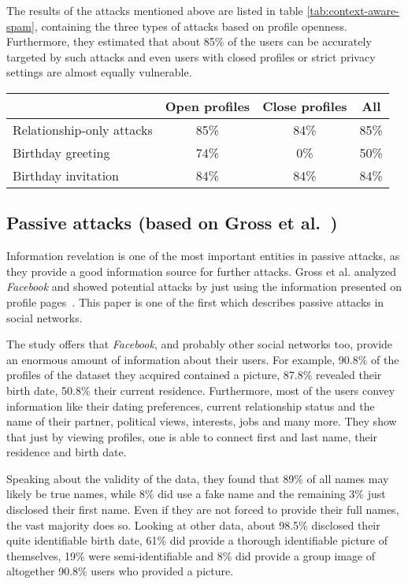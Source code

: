 The results of the attacks mentioned above are listed in table
\ref{tab:context-aware-spam}, containing the three types of attacks based on
profile openness. Furthermore, they estimated that about 85\% of the users
can be accurately targeted by such attacks and even users with closed
profiles or strict privacy settings are almost equally vulnerable.

\begin{table*}[ht]
  \centering
  \begin{tabular}{lccc}
    \toprule
    & Open profiles & Close profiles & All\\
    \midrule
    Relationship-only attacks & 85\% & 84\% & 85\% \\
    Birthday greeting         & 74\% &  0\% & 50\% \\
    Birthday invitation       & 84\% & 84\% & 84\% \\
    \bottomrule
  \end{tabular}
  \caption{Results of the case study of Brown et al.~\cite{brown2008}}
  \label{tab:context-aware-spam}
\end{table*}

\subsection[Passive attacks]{Passive attacks (based on Gross et al.~\cite{gross2005})}

Information revelation is one of the most important entities in passive attacks,
as they provide a good information source for further attacks. Gross et al.
analyzed \textit{Facebook} and showed potential attacks by just using the
information presented on profile pages~\cite{gross2005}. This paper is one
of the first which describes passive attacks in social networks.

The study offers that \textit{Facebook}, and probably other social networks
too, provide an enormous amount of information about their users. For example,
90.8\% of the profiles of the dataset they acquired contained a picture, 87.8\%
revealed their birth date, 50.8\% their current residence. Furthermore, most of
the users convey information like their dating preferences, current relationship
status and the name of their partner, political views, interests, jobs and many
more. They show that just by viewing profiles, one is able to connect first
and last name, their residence and birth date.

Speaking about the validity of the data, they found that 89\% of all names may
likely be true names, while 8\% did use a fake name and the remaining 3\% just
disclosed their first name. Even if they are not forced to provide their full
names, the vast majority does so. Looking at other data, about 98.5\% disclosed
their quite identifiable birth date, 61\% did provide a thorough identifiable
picture of themselves, 19\% were semi-identifiable and 8\% did provide a group
image of altogether 90.8\% users who provided a picture.

